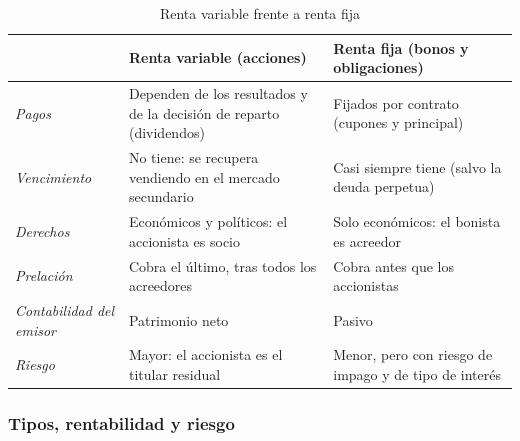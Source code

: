 \documentclass[11pt]{article}
\begin{document}
\begin{table}[H]
\centering
\caption{Renta variable frente a renta fija}\label{tab:renta-fija-variable}
\small
\begin{tabular}{>{\raggedright\arraybackslash}m{3.2cm}>{\raggedright\arraybackslash}m{5.6cm}>{\raggedright\arraybackslash}m{5.6cm}}
\toprule
\rowcolor{tceeazulpalido} & \textbf{Renta variable (acciones)} & \textbf{Renta fija (bonos y obligaciones)}\\
\midrule
\emph{Pagos} & Dependen de los resultados y de la decisión de reparto (dividendos) & Fijados por contrato (cupones y principal)\\
\addlinespace[0.2em]
\emph{Vencimiento} & No tiene: se recupera vendiendo en el mercado secundario & Casi siempre tiene (salvo la deuda perpetua)\\
\addlinespace[0.2em]
\emph{Derechos} & Económicos y políticos: el accionista es socio & Solo económicos: el bonista es acreedor\\
\addlinespace[0.2em]
\emph{Prelación} & Cobra el último, tras todos los acreedores & Cobra antes que los accionistas\\
\addlinespace[0.2em]
\emph{Contabilidad del emisor} & Patrimonio neto & Pasivo\\
\addlinespace[0.2em]
\rowcolor{tceesalvia}\emph{Riesgo} & Mayor: el accionista es el titular residual & Menor, pero con riesgo de impago y de tipo de interés\\
\bottomrule
\end{tabular}
\end{table}

\subsubsection{Tipos, rentabilidad y riesgo}\label{sec:tipos-rentabilidad}
\end{document}
